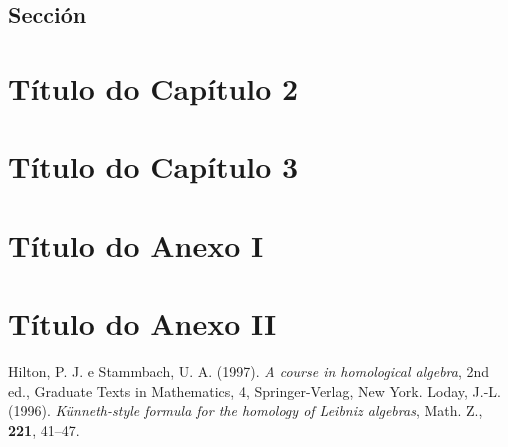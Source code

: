 \documentclass[11pt,a4paper]{book}
\theoremstyle{definition}
\theoremstyle{remark}
\begin{document}
\section{Sección}


\chapter{Título do Capítulo 2}




\chapter{Título do Capítulo 3}





\renewcommand{\thechapter}{\Roman{chapter}}
\appendix

\chapter{Título do Anexo I}


\chapter{Título do Anexo II}

\backmatter
\begin{thebibliography}{99}

%
 Hilton, P. J. e Stammbach, U. A. (1997). \emph{A course in homological algebra}, 2nd ed., Graduate Texts in Mathematics, 4, Springer-Verlag,  New York.
 Loday, J.-L. (1996). \emph{Künneth-style formula for the homology of Leibniz algebras}, Math. Z., \textbf{221}, 41--47.
%
\end{thebibliography}
\end{document}

